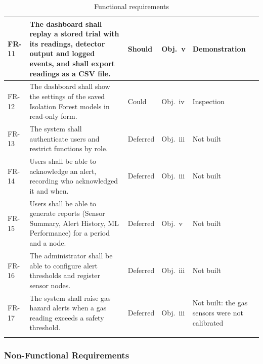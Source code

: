 \documentclass[12pt, a4paper]{article}
\begin{document}
\begin{longtable}{|p{1.3cm}|p{6.0cm}|p{1.5cm}|p{1.3cm}|p{3.0cm}|}
\hline
FR-11 & The dashboard shall replay a stored trial with its readings, detector output and logged events, and shall export readings as a CSV file. & Should & Obj.~v & Demonstration \\
\hline
FR-12 & The dashboard shall show the settings of the saved Isolation Forest models in read-only form. & Could & Obj.~iv & Inspection \\
\hline
FR-13 & The system shall authenticate users and restrict functions by role. & Deferred & Obj.~iii & Not built \\
\hline
FR-14 & Users shall be able to acknowledge an alert, recording who acknowledged it and when. & Deferred & Obj.~iii & Not built \\
\hline
FR-15 & Users shall be able to generate reports (Sensor Summary, Alert History, ML Performance) for a period and a node. & Deferred & Obj.~v & Not built \\
\hline
FR-16 & The administrator shall be able to configure alert thresholds and register sensor nodes. & Deferred & Obj.~iii & Not built \\
\hline
FR-17 & The system shall raise gas hazard alerts when a gas reading exceeds a safety threshold. & Deferred & Obj.~iii & Not built: the gas sensors were not calibrated \\
\hline
\caption{Functional requirements}\label{tab:fr}\\
\end{longtable}

\clearpage
\subsubsection{Non-Functional Requirements}
\end{document}
